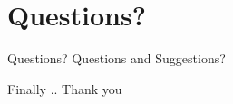\documentclass[xcolor=dvipsnames]{beamer}
\begin{document}

\section{Questions?}
\begin{frame}{Questions?}
\centering
Questions and Suggestions? 
\end{frame}


\begin{frame}{Finally ..}
Thank you
\end{frame}
\end{document}
